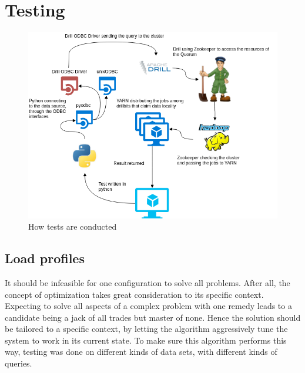 \documentclass[a4paper,english]{report}
\begin{document}
		\section{Testing}
			\begin{figure}[h]
				\includegraphics[width=\textwidth]{test_workflow}
				\caption{How tests are conducted}
			\end{figure}
			\subsection{Load profiles}
				It should be infeasible for one configuration to solve all problems. After all, the concept of optimization takes great consideration to its specific context. Expecting to solve all aspects of a complex problem with one remedy leads to a candidate being a jack of all trades but master of none. Hence the solution should be tailored to a specific context, by letting the algorithm aggressively tune the system to work in its current state. To make sure this algorithm performs this way, testing was done on different kinds of data sets, with different kinds of queries.
				
\end{document}
